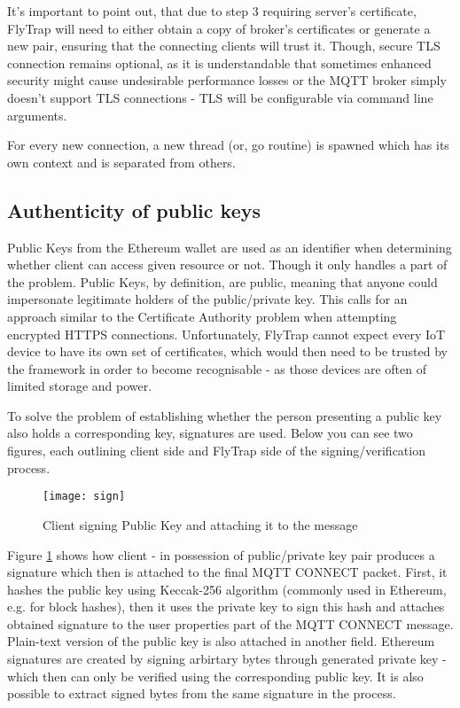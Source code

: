 It's important to point out, that due to step 3 requiring server's certificate, FlyTrap will need to either obtain a copy of broker's certificates or generate a new pair, ensuring that the connecting clients will trust it. Though, secure TLS connection remains optional, as it is understandable that sometimes enhanced security might cause undesirable performance losses or the MQTT broker simply doesn't support TLS connections - TLS will be configurable via command line arguments.

For every new connection, a new thread (or, go routine) is spawned which has its own context and is separated from others.

\subsection{Authenticity of public keys}
Public Keys from the Ethereum wallet are used as an identifier when determining whether client can access given resource or not. Though it only handles a part of the problem. Public Keys, by definition, are public, meaning that anyone could impersonate legitimate holders of the public/private key. This calls for an approach similar to the Certificate Authority problem when attempting encrypted HTTPS connections. Unfortunately, FlyTrap cannot expect every IoT device to have its own set of certificates, which would then need to be trusted by the framework in order to become recognisable - as those devices are often of limited storage and power.

To solve the problem of establishing whether the person presenting a public key also holds a corresponding key, signatures are used. Below you can see two figures, each outlining client side and FlyTrap side of the signing/verification process.

\begin{figure}[h]
    \centering
    \texttt{[image: sign]}
    \caption{Client signing Public Key and attaching it to the message}
    \label{fig:sign}
\end{figure}

Figure \ref{fig:sign} shows how client - in possession of public/private key pair produces a signature which then is attached to the final MQTT CONNECT packet. First, it hashes the public key using Keccak-256 algorithm \cite{bertoni2009keccak} (commonly used in Ethereum, e.g. for block hashes), then it uses the private key to sign this hash and attaches obtained signature to the user properties part of the MQTT CONNECT message. Plain-text version of the public key is also attached in another field. Ethereum signatures are created by signing arbirtary bytes through generated private key - which then can only be verified using the corresponding public key. It is also possible to extract signed bytes from the same signature in the process.

